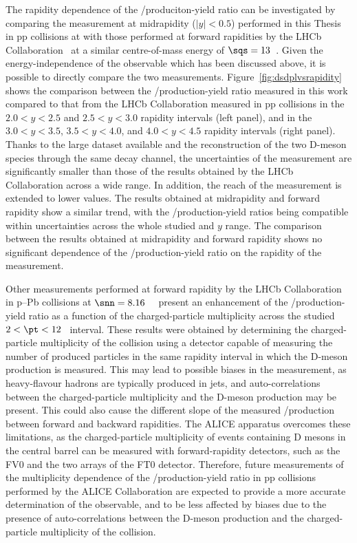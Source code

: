 The rapidity dependence of the \ds/\dpl produciton-yield ratio can be investigated by comparing the measurement at midrapidity ($\lvert y\rvert<0.5$) performed in this Thesis in pp collisions at \thirteen with those performed at forward rapidities by the LHCb Collaboration~\cite{LHCb:2015swx} at a similar centre-of-mass energy of $\sqs=13$~\tev. Given the energy-independence of the observable which has been discussed above, it is possible to directly compare the two measurements. Figure~\ref{fig:dsdplvsrapidity} shows the comparison between the \ds/\dpl production-yield ratio measured in this work compared to that from the LHCb Collaboration measured in pp collisions in the $2.0<y<2.5$ and $2.5<y<3.0$ rapidity intervals (left panel), and in the $3.0<y<3.5$, $3.5<y<4.0$, and $4.0<y<4.5$ rapidity intervals (right panel). Thanks to the large dataset available and the reconstruction of the two D-meson species through the same decay channel, the uncertainties of the measurement are significantly smaller than those of the results obtained by the LHCb Collaboration across a wide \pt range. In addition, the \pt reach of the measurement is extended to lower values. The results obtained at midrapidity and forward rapidity show a similar trend, with the \ds/\dpl production-yield ratios being compatible within uncertainties across the whole studied \pt and $y$ range. The comparison between the results obtained at midrapidity and forward rapidity shows no significant dependence of the \ds/\dpl production-yield ratio on the rapidity of the measurement.


Other measurements performed at forward rapidity by the LHCb Collaboration in p--Pb collisions at $\snn=8.16$~\tev~\cite{LHCb:2023rpm} present an enhancement of the \ds/\dpl production-yield ratio as a function of the charged-particle multiplicity across the studied \mbox{$2<\pt<12$~\gevc} interval. These results were obtained by determining the charged-particle multiplicity of the collision using a detector capable of measuring the number of produced particles in the same rapidity interval in which the D-meson production is measured. This may lead to possible biases in the measurement, as heavy-flavour hadrons are typically produced in jets, and auto-correlations between the charged-particle multiplicity and the D-meson production may be present. This could also cause the different slope of the measured \ds/\dpl production between forward and backward rapidities. The ALICE apparatus overcomes these limitations, as the charged-particle multiplicity of events containing D mesons in the central barrel can be measured with forward-rapidity detectors, such as the FV0 and the two arrays of the FT0 detector. Therefore, future measurements of the multiplicity dependence of the \ds/\dpl production-yield ratio in pp collisions performed by the ALICE Collaboration are expected to provide a more accurate determination of the observable, and to be less affected by biases due to the presence of auto-correlations between the D-meson production and the charged-particle multiplicity of the collision. 
